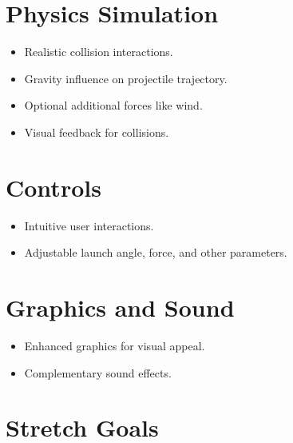 \documentclass{article}
\begin{document}
\section{Physics Simulation}
\begin{itemize}
    \item Realistic collision interactions.
    \item Gravity influence on projectile trajectory.
    \item Optional additional forces like wind.
    \item Visual feedback for collisions.
\end{itemize}

\section{Controls}
\begin{itemize}
    \item Intuitive user interactions.
    \item Adjustable launch angle, force, and other parameters.
\end{itemize}

\section{Graphics and Sound}
\begin{itemize}
    \item Enhanced graphics for visual appeal.
    \item Complementary sound effects.
\end{itemize}

\section{Stretch Goals}
\end{document}
